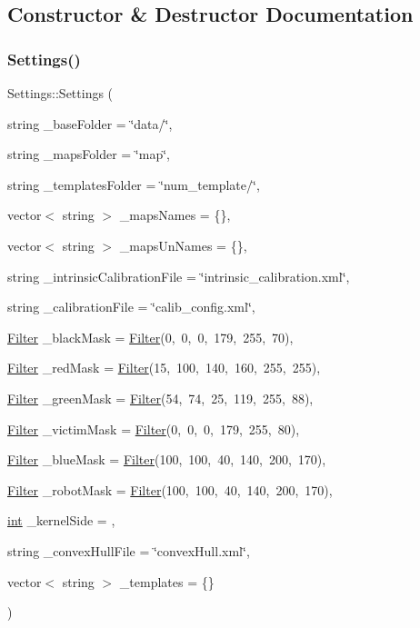 \subsection{Constructor \& Destructor Documentation}
\mbox{\label{class_settings_a716069efb4808f2c395dfa218ec1c540}} 
\subsubsection{\texorpdfstring{Settings()}{Settings()}}
{\footnotesize\ttfamily Settings\+::\+Settings (\begin{DoxyParamCaption}\item[{string}]{\+\_\+base\+Folder = {\ttfamily \char`\"{}data/\char`\"{}},  }\item[{string}]{\+\_\+maps\+Folder = {\ttfamily \char`\"{}map\char`\"{}},  }\item[{string}]{\+\_\+templates\+Folder = {\ttfamily \char`\"{}num\+\_\+template/\char`\"{}},  }\item[{vector$<$ string $>$}]{\+\_\+maps\+Names = {\ttfamily \{\}},  }\item[{vector$<$ string $>$}]{\+\_\+maps\+Un\+Names = {\ttfamily \{\}},  }\item[{string}]{\+\_\+intrinsic\+Calibration\+File = {\ttfamily \char`\"{}intrinsic\+\_\+calibration.xml\char`\"{}},  }\item[{string}]{\+\_\+calibration\+File = {\ttfamily \char`\"{}calib\+\_\+config.xml\char`\"{}},  }\item[{\mbox{\hyperlink{class_filter}{Filter}}}]{\+\_\+black\+Mask = {\ttfamily \mbox{\hyperlink{class_filter}{Filter}}(0,~0,~0,~179,~255,~70)},  }\item[{\mbox{\hyperlink{class_filter}{Filter}}}]{\+\_\+red\+Mask = {\ttfamily \mbox{\hyperlink{class_filter}{Filter}}(15,~100,~140,~160,~255,~255)},  }\item[{\mbox{\hyperlink{class_filter}{Filter}}}]{\+\_\+green\+Mask = {\ttfamily \mbox{\hyperlink{class_filter}{Filter}}(54,~74,~25,~119,~255,~88)},  }\item[{\mbox{\hyperlink{class_filter}{Filter}}}]{\+\_\+victim\+Mask = {\ttfamily \mbox{\hyperlink{class_filter}{Filter}}(0,~0,~0,~179,~255,~80)},  }\item[{\mbox{\hyperlink{class_filter}{Filter}}}]{\+\_\+blue\+Mask = {\ttfamily \mbox{\hyperlink{class_filter}{Filter}}(100,~100,~40,~140,~200,~170)},  }\item[{\mbox{\hyperlink{class_filter}{Filter}}}]{\+\_\+robot\+Mask = {\ttfamily \mbox{\hyperlink{class_filter}{Filter}}(100,~100,~40,~140,~200,~170)},  }\item[{\mbox{\hyperlink{draw_8hh_aa620a13339ac3a1177c86edc549fda9b}{int}}}]{\+\_\+kernel\+Side = {},  }\item[{string}]{\+\_\+convex\+Hull\+File = {\ttfamily \char`\"{}convexHull.xml\char`\"{}},  }\item[{vector$<$ string $>$}]{\+\_\+templates = {\ttfamily \{\}} }\end{DoxyParamCaption})}



